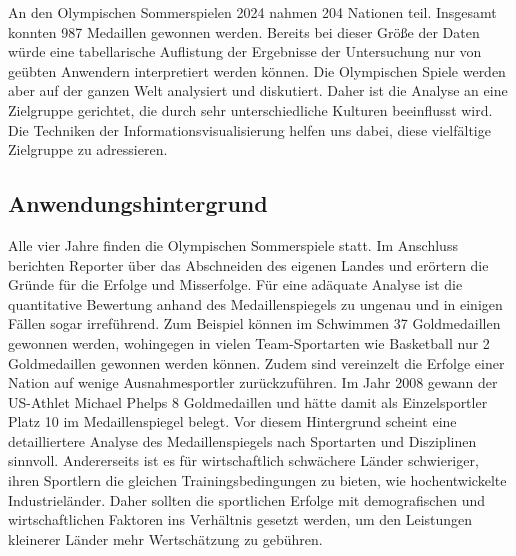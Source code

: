 An den Olympischen Sommerspielen 2024 nahmen 204 Nationen teil. Insgesamt konnten 987 Medaillen gewonnen werden. Bereits bei dieser Größe der Daten würde eine tabellarische Auflistung der Ergebnisse der Untersuchung nur von geübten Anwendern interpretiert werden können. Die Olympischen Spiele werden aber auf der ganzen Welt analysiert und diskutiert. Daher ist die Analyse an eine Zielgruppe gerichtet, die durch sehr unterschiedliche Kulturen beeinflusst wird. Die Techniken der Informationsvisualisierung helfen uns dabei, diese vielfältige Zielgruppe zu adressieren.

\subsection{Anwendungshintergrund}
Alle vier Jahre finden die Olympischen Sommerspiele statt. Im Anschluss berichten Reporter über das Abschneiden des eigenen Landes und erörtern die Gründe für die Erfolge und Misserfolge. Für eine adäquate Analyse ist die quantitative Bewertung anhand des Medaillenspiegels zu ungenau und in einigen Fällen sogar irreführend. Zum Beispiel können im Schwimmen 37 Goldmedaillen gewonnen werden, wohingegen in vielen Team-Sportarten wie Basketball nur 2 Goldmedaillen gewonnen werden können. Zudem sind vereinzelt die Erfolge einer Nation auf wenige Ausnahmesportler zurückzuführen. Im Jahr 2008 gewann der US-Athlet Michael Phelps 8 Goldmedaillen und hätte damit als Einzelsportler Platz 10 im Medaillenspiegel belegt. Vor diesem Hintergrund scheint eine detailliertere Analyse des Medaillenspiegels nach Sportarten und Disziplinen sinnvoll. Andererseits ist es für wirtschaftlich schwächere Länder schwieriger, ihren Sportlern die gleichen Trainingsbedingungen zu bieten, wie hochentwickelte Industrieländer. Daher sollten die sportlichen Erfolge mit demografischen und wirtschaftlichen Faktoren ins Verhältnis gesetzt werden, um den Leistungen kleinerer Länder mehr Wertschätzung zu gebühren. 


